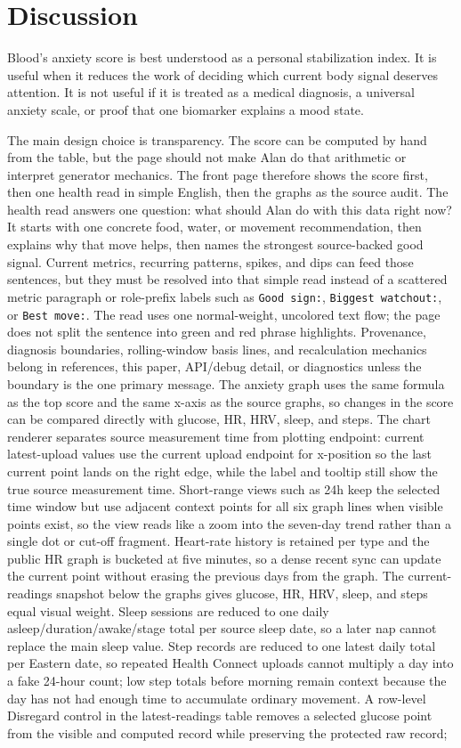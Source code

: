 \documentclass[12pt,letterpaper]{article}
\begin{document}
\section{Discussion}

Blood's anxiety score is best understood as a personal stabilization index. It is useful when it reduces the work of deciding which current body signal deserves attention. It is not useful if it is treated as a medical diagnosis, a universal anxiety scale, or proof that one biomarker explains a mood state.

The main design choice is transparency. The score can be computed by hand from the table, but the page should not make Alan do that arithmetic or interpret generator mechanics. The front page therefore shows the score first, then one health read in simple English, then the graphs as the source audit. The health read answers one question: what should Alan do with this data right now? It starts with one concrete food, water, or movement recommendation, then explains why that move helps, then names the strongest source-backed good signal. Current metrics, recurring patterns, spikes, and dips can feed those sentences, but they must be resolved into that simple read instead of a scattered metric paragraph or role-prefix labels such as \texttt{Good sign:}, \texttt{Biggest watchout:}, or \texttt{Best move:}. The read uses one normal-weight, uncolored text flow; the page does not split the sentence into green and red phrase highlights. Provenance, diagnosis boundaries, rolling-window basis lines, and recalculation mechanics belong in references, this paper, API/debug detail, or diagnostics unless the boundary is the one primary message. The anxiety graph uses the same formula as the top score and the same x-axis as the source graphs, so changes in the score can be compared directly with glucose, HR, HRV, sleep, and steps. The chart renderer separates source measurement time from plotting endpoint: current latest-upload values use the current upload endpoint for x-position so the last current point lands on the right edge, while the label and tooltip still show the true source measurement time. Short-range views such as 24h keep the selected time window but use adjacent context points for all six graph lines when visible points exist, so the view reads like a zoom into the seven-day trend rather than a single dot or cut-off fragment. Heart-rate history is retained per type and the public HR graph is bucketed at five minutes, so a dense recent sync can update the current point without erasing the previous days from the graph. The current-readings snapshot below the graphs gives glucose, HR, HRV, sleep, and steps equal visual weight. Sleep sessions are reduced to one daily asleep/duration/awake/stage total per source sleep date, so a later nap cannot replace the main sleep value. Step records are reduced to one latest daily total per Eastern date, so repeated Health Connect uploads cannot multiply a day into a fake 24-hour count; low step totals before morning remain context because the day has not had enough time to accumulate ordinary movement. A row-level Disregard control in the latest-readings table removes a selected glucose point from the visible and computed record while preserving the protected raw record; 
\end{document}
